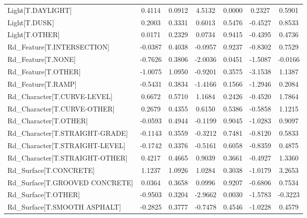\begin{longtable}{p{4cm}cccccc}
Light[T.DAYLIGHT]                                  &  0.4114 &    0.0912 &  4.5132 &       0.0000 &  0.2327 &  0.5901 \\
Light[T.DUSK]                                      &  0.2003 &    0.3331 &  0.6013 &       0.5476 & -0.4527 &  0.8533 \\
Light[T.OTHER]                                     &  0.0171 &    0.2329 &  0.0734 &       0.9415 & -0.4395 &  0.4736 \\
Rd\_Feature[T.INTERSECTION]                         & -0.0387 &    0.4038 & -0.0957 &       0.9237 & -0.8302 &  0.7529 \\
Rd\_Feature[T.NONE]                                 & -0.7626 &    0.3806 & -2.0036 &       0.0451 & -1.5087 & -0.0166 \\
Rd\_Feature[T.OTHER]                                & -1.0075 &    1.0950 & -0.9201 &       0.3575 & -3.1538 &  1.1387 \\
Rd\_Feature[T.RAMP]                                 & -0.5431 &    0.3834 & -1.4166 &       0.1566 & -1.2946 &  0.2084 \\
Rd\_Character[T.CURVE-LEVEL]                        &  0.6672 &    0.5710 &  1.1684 &       0.2426 & -0.4520 &  1.7864 \\
Rd\_Character[T.CURVE-OTHER]                        &  0.2679 &    0.4355 &  0.6150 &       0.5386 & -0.5858 &  1.1215 \\
Rd\_Character[T.OTHER]                              & -0.0593 &    0.4944 & -0.1199 &       0.9045 & -1.0283 &  0.9097 \\
Rd\_Character[T.STRAIGHT-GRADE]                     & -0.1143 &    0.3559 & -0.3212 &       0.7481 & -0.8120 &  0.5833 \\
Rd\_Character[T.STRAIGHT-LEVEL]                     & -0.1742 &    0.3376 & -0.5161 &       0.6058 & -0.8359 &  0.4875 \\
Rd\_Character[T.STRAIGHT-OTHER]                     &  0.4217 &    0.4665 &  0.9039 &       0.3661 & -0.4927 &  1.3360 \\
Rd\_Surface[T.CONCRETE]                             &  1.1237 &    1.0926 &  1.0284 &       0.3038 & -1.0179 &  3.2653 \\
Rd\_Surface[T.GROOVED CONCRETE]                     &  0.0364 &    0.3658 &  0.0996 &       0.9207 & -0.6806 &  0.7534 \\
Rd\_Surface[T.OTHER]                                & -0.9503 &    0.3204 & -2.9662 &       0.0030 & -1.5783 & -0.3223 \\
Rd\_Surface[T.SMOOTH ASPHALT]                       & -0.2825 &    0.3777 & -0.7478 &       0.4546 & -1.0228 &  0.4579 \\

\end{longtable}
